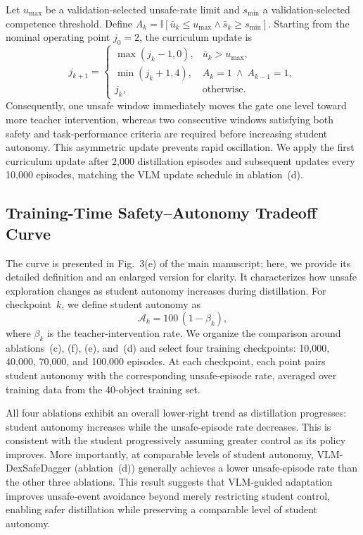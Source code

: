 Let $u_{\max}$ be a validation-selected unsafe-rate limit and $s_{\min}$ a
validation-selected competence threshold. Define
$A_k=\mathbb I[\bar u_k\leq u_{\max}\land\bar s_k\geq s_{\min}]$.
Starting from the nominal operating point $j_0=2$, the curriculum update is
\begin{equation}
j_{k+1}=
\begin{cases}
\max(j_k-1,0), & \bar u_k>u_{\max},\\
\min(j_k+1,4), & A_k=1\ \land\ A_{k-1}=1,\\
j_k,           & \text{otherwise}.
\end{cases}
\label{eq:curriculum_update}
\end{equation}
Consequently, one unsafe window immediately moves the gate one level toward
more teacher intervention, whereas two consecutive windows satisfying both
safety and task-performance criteria are required before increasing student
autonomy. This asymmetric update prevents rapid oscillation. We apply the first
curriculum update after 2{,}000 distillation episodes and subsequent updates
every 10{,}000 episodes, matching the VLM update schedule in ablation~(d).

\subsection{Training-Time Safety--Autonomy Tradeoff Curve}
\label{app:safety_autonomy_trajectory}

The curve is presented in Fig.~3(e) of the main manuscript; here, we provide
its detailed definition and an enlarged version for clarity. It characterizes
how unsafe exploration changes as student autonomy increases during
distillation.
For checkpoint~$k$, we define student autonomy as
\begin{equation}
\mathcal A_k = 100\,(1-\beta_k),
\end{equation}
where $\beta_k$ is the teacher-intervention rate. We organize the comparison
around ablations~(c), (f), (e), and~(d) and select four training checkpoints:
10{,}000, 40{,}000, 70{,}000, and 100{,}000 episodes. At each checkpoint, each
point pairs student autonomy with the corresponding unsafe-episode rate,
averaged over training data from the 40-object training set.

All four ablations exhibit an overall lower-right trend as distillation
progresses: student autonomy increases while the unsafe-episode rate decreases.
This is consistent with the student progressively assuming greater control as
its policy improves.
More importantly, at comparable levels of student autonomy,
VLM-DexSafeDagger (ablation~(d)) generally achieves a lower unsafe-episode rate
than the other three ablations. This result suggests that VLM-guided adaptation
improves unsafe-event avoidance beyond merely restricting student control,
enabling safer distillation while preserving a comparable level of student
autonomy.

